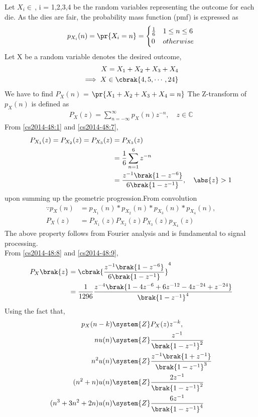 
Let
$X_i\in\,$, i = 1,2,3,4  be the random variables representing the outcome for each die. As the dies are fair, the probability mass function (pmf) is expressed as
\begin{align}
    p_{X_i}(n) = \pr{X_i = n} = 
\begin{cases}
\frac{1}{6} & 1 \le n \le 6
\\
0 & otherwise
\end{cases}\label{cs2014-48:1}
\end{align}
Let X be a random variable denotes the desired outcome,
\begin{align}
    X=X_1+X_2+X_3+X_4\label{cs2014-48:2}\\
    \implies X\in\cbrak{4,5,\cdots,24}
\end{align}
We have to find $P_X(n)$ = $\pr{X_1+X_2+X_3+X_4=n}$
The Z-transform of $p_X(n)$ is defined as
\begin{align}
P_X(z) = \sum_{n = -\infty}^{\infty}p_X(n)z^{-n}, \quad z \in \mathbb{C}
\label{cs2014-48:7}
\end{align}
%
From \eqref{cs2014-48:1} and \eqref{cs2014-48:7}, 
\begin{align}
\nonumber P_{X_1}(z) =P_{X_2}(z)=P_{X_3}(z)&=P_{X_3}(z)\\
&= \frac{1}{6}\sum_{n = 1}^{6}z^{-n}
\\
&=\frac{z^{-1}\brak{1-z^{-6}}}{6\brak{1-z^{-1}}}, \quad \abs{z} > 1
\label{cs2014-48:8}
\end{align}
upon summing up the geometric progression.From convolution
\begin{align}
\because p_X(n) &= p_{X_1}(n)*p_{X_2}(n)*p_{X_3}(n)*p_{X_4}(n),
\\
P_X(z) &= P_{X_1}(z)P_{X_2}(z)P_{X_3}(z)p_{X_4}(z)
\label{cs2014-48:9}
\end{align}
The above property follows from Fourier analysis and is fundamental to signal processing.\\
From \eqref{cs2014-48:8} and \eqref{cs2014-48:9},
\begin{align}
    P_X{\brak{z}}&=\cbrak{\frac{z^{-1}\brak{1-z^{-6}}}{6\brak{1-z^{-1}}}}^4\\
    &= \frac{1}{1296}\frac{z^{-4}\brak{1-4z^{-6}+6z^{-12}-4z^{-24}+z^{-24}}}{\brak{1-z^{-1}}^4}\label{cs2014-48:10}
\end{align}
Using the fact that,\\
\begin{align}
p_X(n-k) &\system{Z}P_X(z)z^{-k},
\\
nu(n)&\system{Z} \frac{z^{-1}}{\brak{1-z^{-1}}^2}\\
n^2u(n)&\system{Z} \frac{z^{-1}\brak{1+z^{-1}}}{\brak{1-z^{-1}}^3}\\
(n^2+n)u(n)&\system{Z} \frac{2z^{-1}}{\brak{1-z^{-1}}^2}\\
(n^3+3n^2+2n)u(n)&\system{Z} \frac{6z^{-1}}{\brak{1-z^{-1}}^4}
\end{align}
